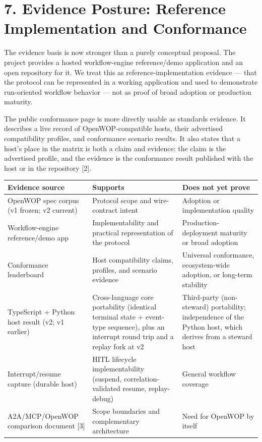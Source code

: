 \documentclass[11pt]{article}
\begin{document}
\section*{7. Evidence Posture: Reference Implementation and Conformance}
The evidence basis is now stronger than a purely conceptual proposal. The project provides a hosted workflow-engine reference/demo application and an open repository for it. We treat this as reference-implementation evidence --- that the protocol can be represented in a working application and used to demonstrate run-oriented workflow behavior --- not as proof of broad adoption or production maturity.

The public conformance page is more directly usable as standards evidence. It describes a live record of OpenWOP-compatible hosts, their advertised compatibility profiles, and conformance scenario results. It also states that a host's place in the matrix is both a claim and evidence: the claim is the advertised profile, and the evidence is the conformance result published with the host or in the repository [2].

\begin{table}[H]\centering\footnotesize
\begin{tabular}{>{\raggedright\arraybackslash}p{}>{\raggedright\arraybackslash}p{}>{\raggedright\arraybackslash}p{}}\hline
\textbf{Evidence source} & \textbf{Supports} & \textbf{Does not yet prove} \\\hline
OpenWOP spec corpus (v1 frozen; v2 current) & Protocol scope and wire-contract intent & Adoption or implementation quality \\\hline
Workflow-engine reference/demo app & Implementability and practical representation of the protocol & Production-deployment maturity or broad adoption \\\hline
Conformance leaderboard & Host compatibility claims, profiles, and scenario evidence & Universal conformance, ecosystem-wide adoption, or long-term stability \\\hline
TypeScript + Python host result (v2; v1 earlier) & Cross-language core portability (identical terminal state + event-type sequence), plus an interrupt round trip and a replay fork at v2 & Third-party (non-steward) portability; independence of the Python host, which derives from a steward host \\\hline
Interrupt/resume capture (durable host) & HITL lifecycle implementability (suspend, correlation-validated resume, replay-debug) & General workflow coverage \\\hline
A2A/MCP/OpenWOP comparison document [3] & Scope boundaries and complementary architecture & Need for OpenWOP by itself \\\hline
\end{tabular}\end{table}
\end{document}
